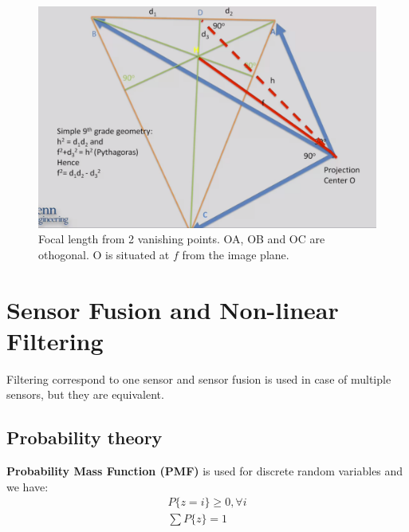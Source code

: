 \begin{figure}[H]
    \centering
    \includegraphics[width=0.94\linewidth]{content/focal_length_from_vanishing_points.png}
    \caption{Focal length from 2 vanishing points. OA, OB and OC are othogonal. O is situated at $f$ from the image plane.}
    \label{fig:focal_length_from_vanishing_points}
\end{figure}




























\chapter{Sensor Fusion and Non-linear Filtering}

Filtering correspond to one sensor and sensor fusion is used in case of multiple sensors, but they are equivalent.

\section{Probability theory}
\textbf{Probability Mass Function (PMF)} is used for discrete random variables and we have:
\begin{equation}
\begin{split}
    P\{z=i\} \ge 0,  \forall i \\
    \sum P\{z\} = 1
\end{split}
\end{equation}

